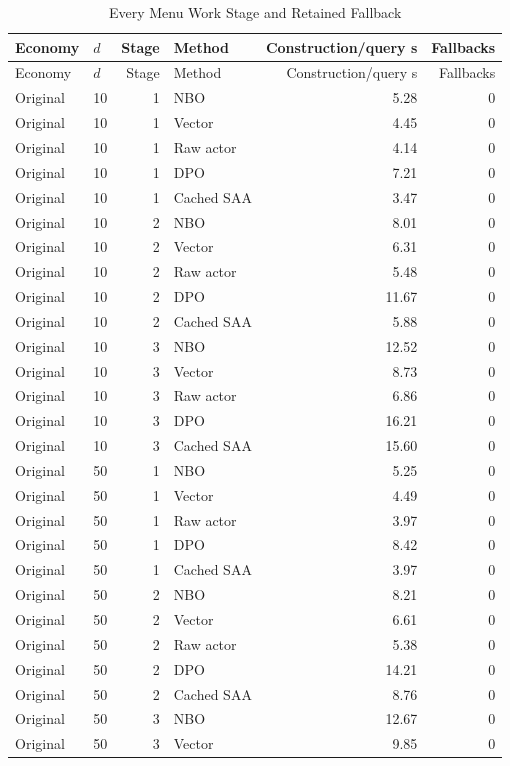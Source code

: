 \begin{longtable}{llrlrr}
\caption{Every Menu Work Stage and Retained Fallback}\label{tab:r16menuallwork}\\
\toprule
Economy & $d$ & Stage & Method & Construction/query s & Fallbacks \\
\midrule
\endfirsthead
\toprule
Economy & $d$ & Stage & Method & Construction/query s & Fallbacks \\
\midrule\endhead
Original & 10 & 1 & NBO & 5.28 & 0 \\
Original & 10 & 1 & Vector & 4.45 & 0 \\
Original & 10 & 1 & Raw actor & 4.14 & 0 \\
Original & 10 & 1 & DPO & 7.21 & 0 \\
Original & 10 & 1 & Cached SAA & 3.47 & 0 \\
Original & 10 & 2 & NBO & 8.01 & 0 \\
Original & 10 & 2 & Vector & 6.31 & 0 \\
Original & 10 & 2 & Raw actor & 5.48 & 0 \\
Original & 10 & 2 & DPO & 11.67 & 0 \\
Original & 10 & 2 & Cached SAA & 5.88 & 0 \\
Original & 10 & 3 & NBO & 12.52 & 0 \\
Original & 10 & 3 & Vector & 8.73 & 0 \\
Original & 10 & 3 & Raw actor & 6.86 & 0 \\
Original & 10 & 3 & DPO & 16.21 & 0 \\
Original & 10 & 3 & Cached SAA & 15.60 & 0 \\
Original & 50 & 1 & NBO & 5.25 & 0 \\
Original & 50 & 1 & Vector & 4.49 & 0 \\
Original & 50 & 1 & Raw actor & 3.97 & 0 \\
Original & 50 & 1 & DPO & 8.42 & 0 \\
Original & 50 & 1 & Cached SAA & 3.97 & 0 \\
Original & 50 & 2 & NBO & 8.21 & 0 \\
Original & 50 & 2 & Vector & 6.61 & 0 \\
Original & 50 & 2 & Raw actor & 5.38 & 0 \\
Original & 50 & 2 & DPO & 14.21 & 0 \\
Original & 50 & 2 & Cached SAA & 8.76 & 0 \\
Original & 50 & 3 & NBO & 12.67 & 0 \\
Original & 50 & 3 & Vector & 9.85 & 0 \\

\end{longtable}
